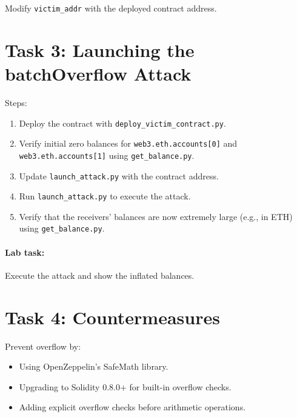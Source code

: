 Modify \texttt{victim\_addr} with the deployed contract address.

\section{Task 3: Launching the batchOverflow Attack}

Steps:
\begin{enumerate}
    \item Deploy the contract with \texttt{deploy\_victim\_contract.py}.
    \item Verify initial zero balances for \texttt{web3.eth.accounts[0]} and \texttt{web3.eth.accounts[1]} using \texttt{get\_balance.py}.
    \item Update \texttt{launch\_attack.py} with the contract address.
    \item Run \texttt{launch\_attack.py} to execute the attack.
    \item Verify that the receivers’ balances are now extremely large (e.g., in ETH) using \texttt{get\_balance.py}.
\end{enumerate}

\paragraph{Lab task:} Execute the attack and show the inflated balances.

\section{Task 4: Countermeasures}

Prevent overflow by:
\begin{itemize}
    \item Using OpenZeppelin’s SafeMath library.
    \item Upgrading to Solidity 0.8.0+ for built-in overflow checks.
    \item Adding explicit overflow checks before arithmetic operations.
\end{itemize}

